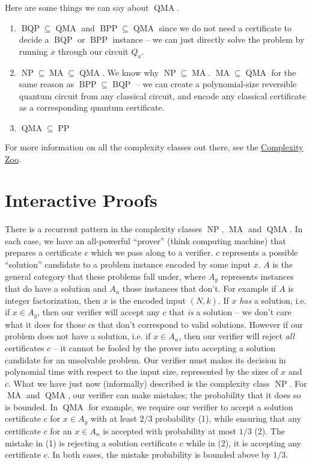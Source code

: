 \documentclass[11pt]{article}
\newcommand{\bqp}{\operatorname{BQP}}
\newcommand{\bpp}{\operatorname{BPP}}
\newcommand{\np}{\operatorname{NP}}
\newcommand{\pp}{\operatorname{PP}}
\newcommand{\qma}{\operatorname{QMA}}
\newcommand{\ma}{\operatorname{MA}}
\begin{document}
\noindent Here are some things we can say about $\qma$. 
\begin{enumerate}
\item $\bqp \subseteq \qma$ and $\bpp \subseteq \qma$ since we do not need a certificate to decide a $\bqp$ or $\bpp$ instance -- we can just directly solve the problem by running $x$ through our circuit $Q_x$.

\item $\np \subseteq \ma \subseteq \qma$. We know why $\np \subseteq \ma$. $\ma \subseteq \qma$ for the same reason as $\bpp \subseteq \bqp$ -- we can create a polynomial-size reversible quantum circuit from any classical circuit, and encode any classical certificate as a corresponding quantum certificate.

\item $\qma \subseteq \pp$
\end{enumerate}
For more information on all the complexity classes out there, see the \href{https://complexityzoo.uwaterloo.ca/Complexity_Zoo}{Complexity Zoo}.

\section{Interactive Proofs}
There is a recurrent pattern in the complexity classes $\np$, $\ma$ and $\qma$. In each case, we have an all-powerful ``prover'' (think computing machine) that prepares a certificate $c$ which we pass along to a verifier. $c$ represents a possible ``solution'' candidate to a problem instance encoded by some input $x$. $A$ is the general category that these problems fall under, where $A_y$ represents instances that do have a solution and $A_n$ those instances that don't. For example if $A$ is integer factorization, then $x$ is the encoded input $(N, k)$. If $x$ \emph{has} a solution, i.e. if $x \in A_y$, then our verifier will accept any $c$ that \emph{is} a solution -- we don't care what it does for those $c$s that don't correspond to valid solutions. However if our problem does not have a solution, i.e. if $x \in A_n$, then our verifier will reject \emph{all} certificates $c$ -- it cannot be fooled by the prover into accepting a solution candidate for an unsolvable problem. Our verifier must makes its decision in polynomial time with respect to the input size, represented by the sizes of $x$ and $c$. What we have just now (informally) described is the complexity class $\np$. For $\ma$ and $\qma$, our verifier can make mistakes; the probability that it does so is bounded. In $\qma$ for example, we require our verifier to accept a solution certificate $c$ for $x \in A_y$ with at least $2/3$ probability (1), while ensuring that any certificate $c$ for an $x \in A_n$ is accepted with probability at most $1/3$ (2). The mistake in (1) is rejecting a solution certificate $c$ while in (2), it is accepting any certificate $c$. In both cases, the mistake probability is bounded above by $1/3$. 
\end{document}
